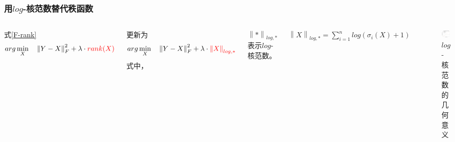 \documentclass[10pt,aspectratio=43,mathserif]{beamer}
\begin{document}
\begin{frame}
\frametitle{\textbf{用$log$-核范数替代秩函数}}
\begin{columns}
\par 式\ref{F-rank}
\begin{displaymath}
arg\min\limits_{X} \quad \left\|Y-X\right\|_F^2 + \lambda \cdot {\color{red}{rank(X)}}
\end{displaymath}
\par 更新为
\begin{equation}
\centering
arg\min\limits_{X} \quad \left\|Y-X\right\|_F^2 + \lambda \cdot {\color{red}{\left\|X\right\|_{log,*}}}
\label{F-LNN}
\end{equation}
式中，
\par $\left\|*\right\|_{log,*}$表示$log$-核范数。
\par $\left\|X\right\|_{log,*} = \sum\limits_{i=1}^{n}log(\sigma_i(X)+1)$

\begin{figure}[!t]
\centering
\includegraphics[scale=0.3]{surrogate-to-rank-1.png}
\caption{$log$-核范数的几何意义}
\label{surrogate-to-rank-1}
\end{figure}
\end{columns}
\end{frame}
\end{document}
